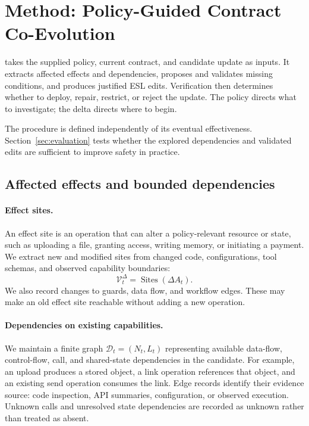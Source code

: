 \section{Method: Policy-Guided Contract Co-Evolution}
\label{sec:method}

\system takes the supplied policy, current contract, and candidate update as inputs. It extracts affected effects and dependencies, proposes and validates missing conditions, and produces justified ESL edits. Verification then determines whether to deploy, repair, restrict, or reject the update. The policy directs what to investigate; the delta directs where to begin.

The procedure is defined independently of its eventual effectiveness. Section~\ref{sec:evaluation} tests whether the explored dependencies and validated edits are sufficient to improve safety in practice.

\subsection{Affected effects and bounded dependencies}
\label{sec:sites}

\paragraph{Effect sites.}
An effect site is an operation that can alter a policy-relevant resource or
state, such as uploading a file, granting access, writing memory, or initiating
a payment. We extract new and modified sites from changed code, configurations,
tool schemas, and observed capability boundaries:
\[
 \mathcal V_t^\Delta=\operatorname{Sites}(\Delta A_t).
\]
We also record changes to guards, data flow, and workflow edges. These may
make an old effect site reachable without adding a new operation.

\paragraph{Dependencies on existing capabilities.}
We maintain a finite graph \(\mathcal D_t=(N_t,L_t)\) representing available
data-flow, control-flow, call, and shared-state dependencies in the candidate.
For example, an upload produces a stored object, a link operation references
that object, and an existing send operation consumes the link. Edge records
identify their evidence source: code inspection, API summaries, configuration,
or observed execution. Unknown calls and unresolved state dependencies are
recorded as unknown rather than treated as absent.

